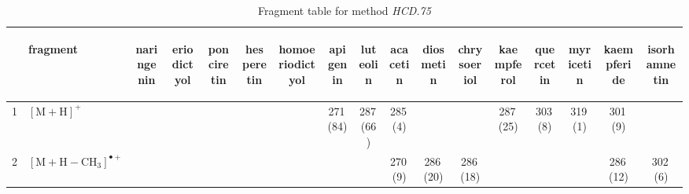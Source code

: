 \documentclass[]{article}
\begin{document}
\begin{table}\caption{Fragment table for method \textit{HCD.75}}{\scriptsize
\begin{tabular}{ll|ccccc|ccccc|ccccc}
  \toprule
 & \begin{sideways} fragment \end{sideways} & \begin{sideways} naringenin \end{sideways} & \begin{sideways} eriodictyol \end{sideways} & \begin{sideways} ponciretin \end{sideways} & \begin{sideways} hesperetin \end{sideways} & \begin{sideways} homoeriodictyol \end{sideways} & \begin{sideways} apigenin \end{sideways} & \begin{sideways} luteolin \end{sideways} & \begin{sideways} acacetin \end{sideways} & \begin{sideways} diosmetin \end{sideways} & \begin{sideways} chrysoeriol \end{sideways} & \begin{sideways} kaempferol \end{sideways} & \begin{sideways} quercetin \end{sideways} & \begin{sideways} myricetin \end{sideways} & \begin{sideways} kaempferide \end{sideways} & \begin{sideways} isorhamnetin \end{sideways} \\ 
  \midrule
1 & $\mathrm{[M{+}H]^+}$ &  &  &  &  &  & 271\,(84) & 287\,(66) & 285\,(4) &  &  & 287\,(25) & 303\,(8) & 319\,(1) & 301\,(9) &  \\ 
  2 & $\mathrm{[M{+}H{-}CH_{3}]^{\bullet+}}$ &  &  &  &  &  &  &  & 270\,(9) & 286\,(20) & 286\,(18) &  &  &  & 286\,(12) & 302\,(6) \\ 

\end{tabular}}
\end{table}
\end{document}
